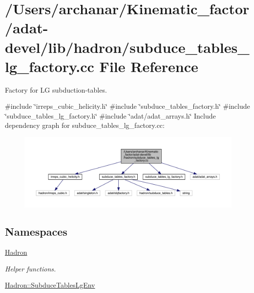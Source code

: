 \hypertarget{adat-devel_2lib_2hadron_2subduce__tables__lg__factory_8cc}{}\section{/\+Users/archanar/\+Kinematic\+\_\+factor/adat-\/devel/lib/hadron/subduce\+\_\+tables\+\_\+lg\+\_\+factory.cc File Reference}
\label{adat-devel_2lib_2hadron_2subduce__tables__lg__factory_8cc}


Factory for LG subduction-\/tables.  


{\ttfamily \#include \char`\"{}irreps\+\_\+cubic\+\_\+helicity.\+h\char`\"{}}\newline
{\ttfamily \#include \char`\"{}subduce\+\_\+tables\+\_\+factory.\+h\char`\"{}}\newline
{\ttfamily \#include \char`\"{}subduce\+\_\+tables\+\_\+lg\+\_\+factory.\+h\char`\"{}}\newline
{\ttfamily \#include \char`\"{}adat/adat\+\_\+arrays.\+h\char`\"{}}\newline
Include dependency graph for subduce\+\_\+tables\+\_\+lg\+\_\+factory.\+cc\+:
\nopagebreak
\begin{figure}[H]
\begin{center}
\leavevmode
\includegraphics[width=350pt]{df/d9c/adat-devel_2lib_2hadron_2subduce__tables__lg__factory_8cc__incl}
\end{center}
\end{figure}
\subsection*{Namespaces}
\begin{DoxyCompactItemize}
\item 
 \mbox{\hyperlink{namespaceHadron}{Hadron}}
\begin{DoxyCompactList}\small\item\em Helper functions. \end{DoxyCompactList}\item 
 \mbox{\hyperlink{namespaceHadron_1_1SubduceTablesLgEnv}{Hadron\+::\+Subduce\+Tables\+Lg\+Env}}
\end{DoxyCompactItemize}
